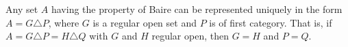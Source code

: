 Any set $A$ having the property of Baire can be represented uniquely in the form $A = G \triangle P$, where $G$ is a regular open set and $P$ is of first category. That is, if $A = G \triangle P = H \triangle Q$ with $G$ and $H$ regular open, then $G = H$ and $P = Q$.
